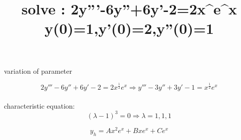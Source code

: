 \documentclass{beamer}
\begin{document}
\title{solve : 2y'''-6y''+6y'-2=2x^{}e^x\\[5]\small {y(0)=1,y'(0)=2,y''(0)=1}}



\begin{frame}

\titlepage  
\end{frame}


\begin{frame}{variation of parameter}

\[
2y'''-6y''+6y'-2=2x^{\frac12}e^x \Rightarrow y'''-3y''+3y'-1=x^{\frac12}e^x
\]
\\[8]
characteristic equation:
\[
(\lambda-1)^3=0 \Rightarrow \lambda=1,1,1    
\]

\[
y_h=Ax^2e^{x}+Bxe^x+Ce^x
\]
\end{frame}
\end{document}
